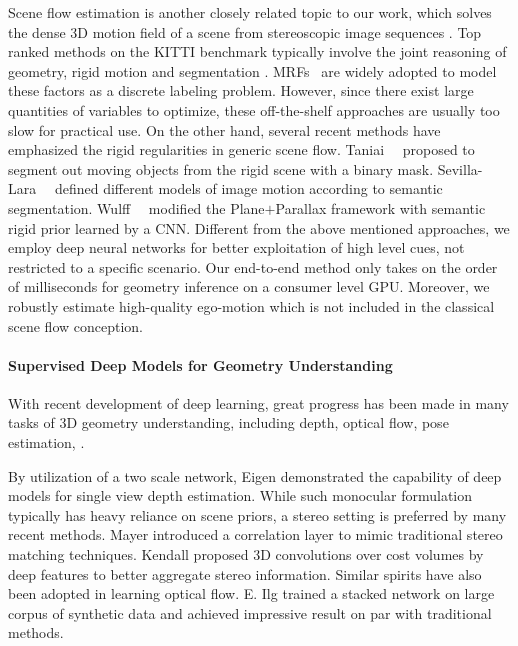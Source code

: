 \documentclass[10pt,twocolumn,letterpaper]{article}
\newcommand{\jpshi}[1]{{{\color{blue} Jianping: #1}}}
\begin{document}
Scene flow estimation is another closely related topic to our work, which solves the dense 3D motion field of a scene from stereoscopic image sequences \cite{vedula1999three}. Top ranked methods on the KITTI benchmark typically involve the joint reasoning of geometry, rigid motion and segmentation \cite{Behl2017ICCV, vogel20153d}. %
MRFs~\cite{li1994markov} are widely adopted to model these factors as a discrete labeling problem. However, since there exist large quantities of variables to optimize, these off-the-shelf approaches are usually too slow for practical use. On the other hand, several recent methods have emphasized the rigid regularities in generic scene flow. Taniai~\etal~\cite{Taniai2017} proposed to segment out moving objects from the rigid scene with a binary mask. 
Sevilla-Lara~\etal~\cite{sevilla2016optical} defined different models of image motion according to semantic segmentation.
Wulff~\etal~\cite{wulff2017optical} modified the Plane$+$Parallax framework with semantic rigid prior learned by a CNN. 
Different from the above mentioned approaches, we employ deep neural networks for better exploitation of high level cues, not restricted to a specific scenario. Our end-to-end method only takes on the order of milliseconds for geometry inference on a consumer level GPU. %
Moreover, we robustly estimate high-quality ego-motion %
which is not included in the classical scene flow conception.

\paragraph{Supervised Deep Models for Geometry Understanding}
With recent development of deep learning, great progress has been made in many tasks of 3D geometry understanding, including depth, optical flow, pose estimation, \etc. 

By utilization of a two scale network, Eigen \etal\cite{EigenPF14} demonstrated the capability of deep models for single view depth estimation. While such monocular formulation typically has heavy reliance on scene priors, a stereo setting is preferred by many recent methods. Mayer \etal\cite{MayerIHFCDB15} introduced a correlation layer to mimic traditional stereo matching techniques. Kendall \etal\cite{kendall2017end} proposed 3D convolutions over cost volumes  by deep features to better aggregate stereo information. Similar spirits have also been adopted in learning optical flow. 
E. Ilg \etal\cite{IMKDB17} trained a stacked network on large corpus of synthetic data and achieved impressive result on par with traditional methods.
\end{document}
